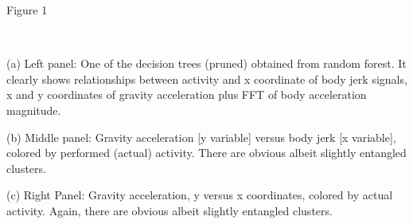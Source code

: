 \documentclass[a4paper,12pt]{extarticle}
\begin{document}
Figure 1

\

(a) Left panel: One of the decision trees (pruned) obtained from random forest. It clearly shows relationships between activity and x coordinate of body jerk signals, x and y coordinates of gravity acceleration plus FFT of body acceleration magnitude.

(b) Middle panel: Gravity acceleration [y variable] versus body jerk [x variable], colored by performed (actual) activity. There are obvious albeit slightly entangled clusters.

(c) Right Panel: Gravity acceleration, y versus x coordinates, colored by actual activity. Again, there are obvious albeit slightly entangled clusters.
\end{document}
